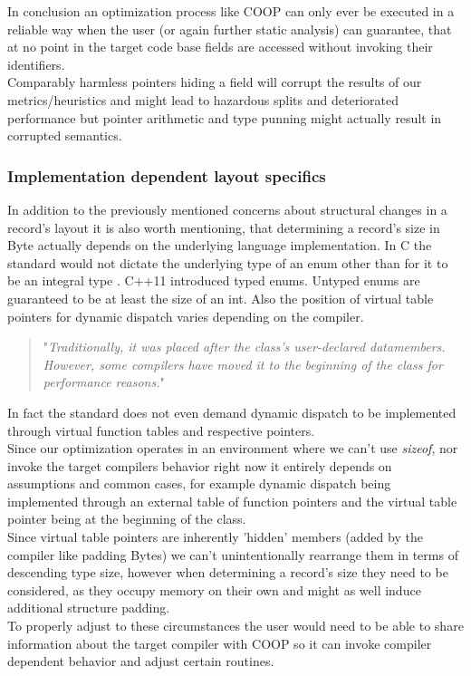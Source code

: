 In conclusion an optimization process like COOP can only ever be executed in a reliable way when the user (or again further static analysis) can guarantee, that at no point in the target code base fields are accessed without invoking their identifiers.\\
Comparably harmless pointers hiding a field will corrupt the results of our metrics/heuristics and might lead to hazardous splits and deteriorated performance but pointer arithmetic and type punning might actually result in corrupted semantics.

\subsubsection{Implementation dependent layout specifics}
In addition to the previously mentioned concerns about structural changes in a record's layout it is also worth mentioning, that determining a record's size in Byte actually depends on the underlying language implementation.
In C the standard would not dictate the underlying type of an enum other than for it to be an integral type . C++11 introduced typed enums. Untyped enums are guaranteed to be at least the size of an int. Also the position of virtual table pointers for dynamic dispatch varies depending on the compiler.
\begin{quote}
	"\textit{Traditionally, it was placed after the class's user-declared datamembers. However, some compilers have moved it to the beginning of the class for performance reasons.}" 
\end{quote}
In fact the standard does not even demand dynamic dispatch to be implemented through virtual function tables and respective pointers.\\
Since our optimization operates in an environment where we can't use \textit{sizeof}, nor invoke the target compilers behavior right now it entirely depends on assumptions and common cases, for example dynamic dispatch being implemented through an external table of function pointers and the virtual table pointer being at the beginning of the class.\\
Since virtual table pointers are inherently 'hidden' members (added by the compiler like padding Bytes) we can't unintentionally rearrange them in terms of descending type size, however when determining a record's size they need to be considered, as they occupy memory on their own and might as well induce additional structure padding.\\
To properly adjust to these circumstances the user would need to be able to share information about the target compiler with COOP so it can invoke compiler dependent behavior and adjust certain routines.

